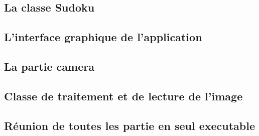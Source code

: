 \documentclass[8pt, french]{article}
\begin{document}
\subsection{La classe Sudoku}
\subsection{L'interface graphique de l'application}
\subsection{La partie camera}
\subsection{Classe de traitement et de lecture de l'image }
\subsection{Réunion de toutes les partie en seul executable}
\end{document}
